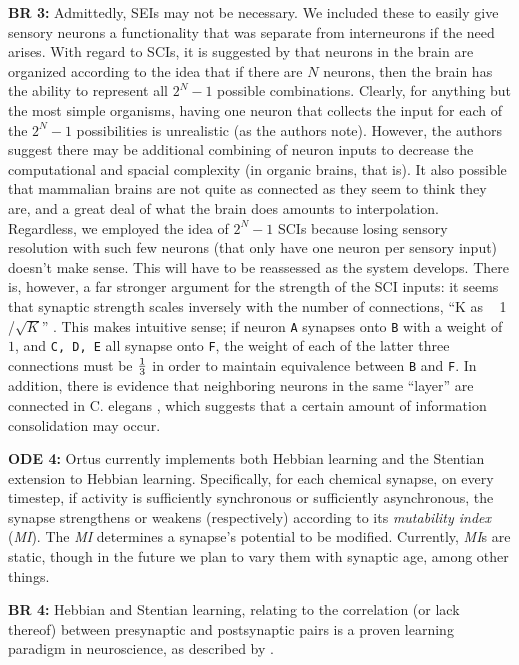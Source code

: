 \documentclass[letterpaper]{article}
\begin{document}
\textbf{BR 3:} Admittedly, SEIs may not be necessary. We included these to easily give sensory neurons a functionality that was separate from interneurons if the need arises. With regard to SCIs, it is suggested by \citet{Xie2016} that neurons in the brain are organized according to the idea that if there are $N$ neurons, then the brain has the ability to represent all $2^N-1$ possible combinations.
Clearly, for anything but the most simple organisms, having one neuron that collects the input for each of the $2^N-1$ possibilities is unrealistic (as the authors note).
However, the authors suggest there may be additional combining of neuron inputs to decrease the computational and spacial complexity (in organic brains, that is).
It also possible that mammalian brains are not quite as connected as they seem to think they are, and a great deal of what the brain does amounts to interpolation.
Regardless, we employed the idea of $2^N-1$ SCIs because losing sensory resolution with such few neurons (that only have one neuron per sensory input) doesn't make sense.
This will have to be reassessed as the system develops.
There is, however, a far stronger argument for the strength of the SCI inputs: it seems that synaptic strength scales inversely with the number of connections, ``K as ~ 1 /$\sqrt{K}$'' \citep{Barral2016}. This makes intuitive sense; if neuron \texttt{A} synapses onto \texttt{B} with a weight of $1$, and \texttt{C, D, E} all synapse onto \texttt{F}, the weight of each of the latter three connections must be $1 \over 3$ in order to maintain equivalence between \texttt{B} and \texttt{F}. In addition, there is evidence that neighboring neurons in the same ``layer'' are connected in C. elegans \citep{Azulay2016}, which suggests that a certain amount of information consolidation may occur.


\textbf{ODE 4:} Ortus currently implements both Hebbian learning and the Stentian extension to Hebbian learning. Specifically, for each chemical synapse, on every timestep, if activity is sufficiently synchronous or sufficiently asynchronous, the synapse strengthens or weakens (respectively) according to its \textit{mutability index} (\textit{MI}). The \textit{MI} determines a synapse's potential to be modified. Currently, \textit{MI}s are static, though in the future we plan to vary them with synaptic age, among other things.

\textbf{BR 4:} Hebbian and Stentian learning, relating to the correlation (or lack thereof) between presynaptic and postsynaptic pairs is a proven learning paradigm in neuroscience, as described by \citet{Kutsarova2016}.
\end{document}
